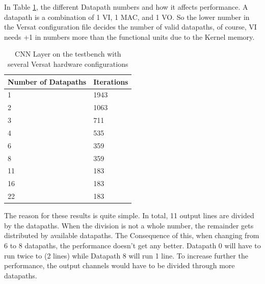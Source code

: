 In Table \ref{table:Iterations}, the different Datapath numbers and how it affects performance.
A datapath is a combination of 1 VI, 1 MAC, and 1 VO. So the lower number in the Versat configuration file
decides the number of valid datapaths, of course, VI needs +1 in numbers more than the functional units due to the Kernel memory.
\newpage
\begin{table}[!htpb]
    \centering
    \begin{tabular}{ll}
    \hline
    \textbf{Number of Datapaths} &  \textbf{Iterations}        \\ \hline
    1          & 1943                 \\
	2          & 1063                 \\
	3          & 711                 \\
	4          & 535                 \\
	6          & 359                 \\
	8          & 359                 \\
	11          & 183                 \\
	16          & 183                 \\
    22            & 183                       \\  \hline
    \end{tabular}
    \label{table:Iterations}
    \caption{CNN Layer on the testbench with several Versat hardware configurations}
\end{table}

The reason for these results is quite simple. In total, 11 output lines are divided
by the datapaths. When the division is not a whole number, the remainder gets distributed
by available datapaths. The Consequence of this, when changing from 6 to 8 datapaths, the performance
doesn't get any better. Datapath 0 will have to run twice to (2 lines) while Datapath 8 will run 1 line.
To increase further the performance, the output channels would have to be divided through more datapaths.